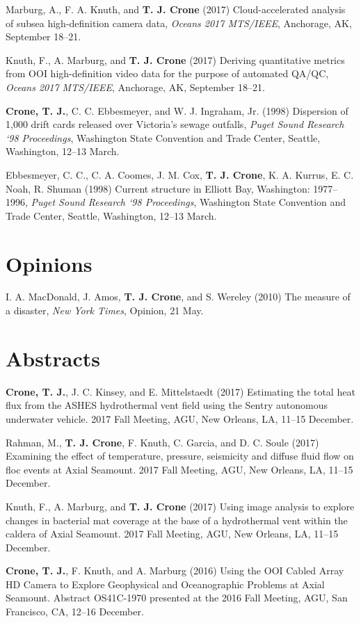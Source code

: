 \documentclass[11pt]{res}
\begin{document}
\begin{resume}
Marburg, A., F. A. Knuth, and {\bf T. J. Crone} (2017) Cloud-accelerated analysis of subsea high-definition camera data, \textit{Oceans 2017 MTS/IEEE}, Anchorage, AK, September 18--21.

Knuth, F., A. Marburg, and {\bf T. J. Crone} (2017) Deriving quantitative metrics from OOI high-definition video data for the purpose of automated QA/QC, \textit{Oceans 2017 MTS/IEEE}, Anchorage, AK, September 18--21.

{\bf Crone, T. J.}, C. C. Ebbesmeyer,
and W. J. Ingraham, Jr. (1998) Dispersion of 1,000 drift cards released over Victoria's sewage outfalls, {\em Puget Sound Research `98 Proceedings}, Washington State Convention and Trade Center, Seattle, Washington, 12--13 March.

Ebbesmeyer, C. C., C. A. Coomes, J. M. Cox, {\bf T. J. Crone}, K. A. Kurrus, E. C. Noah, R. Shuman (1998) Current structure in Elliott Bay, Washington: 1977--1996, {\em Puget Sound Research `98 Proceedings}, Washington State Convention and Trade Center, Seattle, Washington, 12--13 March.

\section{\sc Opinions} I. A. MacDonald, J. Amos, {\bf T. J. Crone}, and S. Wereley (2010) The measure of a disaster, {\em New York Times}, Opinion, 21 May.

\section{\sc Abstracts}

{\bf Crone, T. J.}, J. C. Kinsey, and E. Mittelstaedt (2017) Estimating the total heat flux from the ASHES hydrothermal vent field using the Sentry autonomous underwater vehicle. 2017 Fall Meeting, AGU, New Orleans, LA, 11--15 December.

Rahman, M., {\bf T. J. Crone}, F. Knuth, C. Garcia, and D. C. Soule (2017) Examining the effect of temperature, pressure, seismicity and diffuse fluid flow on floc events at Axial Seamount. 2017 Fall Meeting, AGU, New Orleans, LA, 11--15 December.

Knuth, F., A. Marburg, and {\bf T. J. Crone} (2017) Using image analysis to explore changes in bacterial mat coverage at the base of a hydrothermal vent within the caldera of Axial Seamount. 2017 Fall Meeting, AGU, New Orleans, LA, 11--15 December.

{\bf Crone, T. J.}, F. Knuth, and A. Marburg (2016) Using the OOI Cabled Array HD Camera to Explore Geophysical and Oceanographic Problems at Axial Seamount. Abstract OS41C-1970 presented at the 2016 Fall Meeting, AGU, San Francisco, CA, 12--16 December.


\end{resume}
\end{document}
